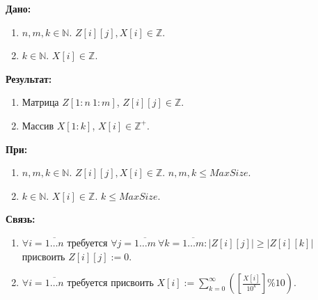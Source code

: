 \textbf{Дано:}
\begin{enumerate}
    \item \(n, m, k \in \mathbb{N}\). \(Z[i][j], X[i] \in \mathbb{Z}\). 
    \item \(k \in \mathbb{N}\). \(X[i] \in \mathbb{Z}\).  
\end{enumerate}

\noindent
\textbf{Результат:}
\begin{enumerate}
   \item Матрица \(Z[1{:}n\ 1{:}m]\), \(Z[i][j] \in \mathbb{Z}\). 
   \item Массив \(X[1{:}k]\), \(X[i] \in \mathbb{Z^{+}}\).  
\end{enumerate} 

\noindent
\textbf{При:} 
\begin{enumerate}
    \item \(n, m, k \in \mathbb{N}\). \(Z[i][j], X[i] \in \mathbb{Z}\). \(n, m, k \leq MaxSize\). 
    \item \(k \in \mathbb{N}\). \(X[i] \in \mathbb{Z}\). \(k \leq MaxSize\). 
\end{enumerate}

\noindent
\textbf{Связь:} 
\begin{enumerate}
    \item \(\forall i = \overline{1 \dots n}\) требуется \(\forall j = \overline{1 \dots m}\ \forall k = \overline{1 \dots m}: \left\vert Z[i][j] \right\vert \geq \left\vert Z[i][k] \right\vert\) присвоить \(Z[i][j] := 0\).
    \item \(\forall i = \overline{1 \dots n}\) требуется присвоить \(X[i] := \sum\limits_{k = 0}^{\infty} \left(\left[\displaystyle \frac{X[i]}{10^k}\right] \% 10\right)\).    
\end{enumerate}